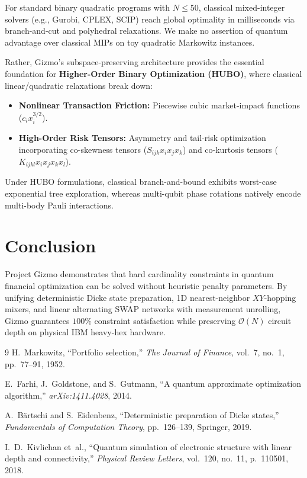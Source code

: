 \documentclass[10pt,twocolumn]{article}
\begin{document}
For standard binary quadratic programs with $N \le 50$, classical mixed-integer solvers (e.g., Gurobi, CPLEX, SCIP) reach global optimality in milliseconds via branch-and-cut and polyhedral relaxations. We make no assertion of quantum advantage over classical MIPs on toy quadratic Markowitz instances.

Rather, Gizmo's subspace-preserving architecture provides the essential foundation for \textbf{Higher-Order Binary Optimization (HUBO)}, where classical linear/quadratic relaxations break down:
\begin{itemize}
    \item \textbf{Nonlinear Transaction Friction:} Piecewise cubic market-impact functions ($c_i x_i^{3/2}$).
    \item \textbf{High-Order Risk Tensors:} Asymmetry and tail-risk optimization incorporating co-skewness tensors ($S_{ijk} x_i x_j x_k$) and co-kurtosis tensors ($K_{ijkl} x_i x_j x_k x_l$).
\end{itemize}
Under HUBO formulations, classical branch-and-bound exhibits worst-case exponential tree exploration, whereas multi-qubit phase rotations natively encode multi-body Pauli interactions.

\section{Conclusion}
Project Gizmo demonstrates that hard cardinality constraints in quantum financial optimization can be solved without heuristic penalty parameters. By unifying deterministic Dicke state preparation, 1D nearest-neighbor $XY$-hopping mixers, and linear alternating SWAP networks with measurement unrolling, Gizmo guarantees $100\%$ constraint satisfaction while preserving $\mathcal{O}(N)$ circuit depth on physical IBM heavy-hex hardware.

\begin{thebibliography}{9}
H.~Markowitz, ``Portfolio selection,'' \emph{The Journal of Finance}, vol.~7, no.~1, pp.~77--91, 1952.

E.~Farhi, J.~Goldstone, and S.~Gutmann, ``A quantum approximate optimization algorithm,'' \emph{arXiv:1411.4028}, 2014.

A.~B{\"a}rtschi and S.~Eidenbenz, ``Deterministic preparation of Dicke states,'' \emph{Fundamentals of Computation Theory}, pp.~126--139, Springer, 2019.

I.~D.~Kivlichan et~al., ``Quantum simulation of electronic structure with linear depth and connectivity,'' \emph{Physical Review Letters}, vol.~120, no.~11, p.~110501, 2018.
\end{thebibliography}
\end{document}
